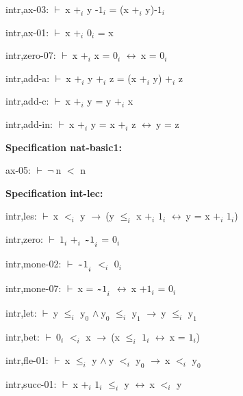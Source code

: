 \documentclass[a4paper]{article}
\newcommand{\tildesym}{\raisebox{-4pt}{\bf\~{}}}
\newcommand{\Fol}{\mbox{$\vdash\ $}}
\newcommand{\Not}{\mbox{$\neg\ $}}
\newcommand{\And}{\mbox{$\wedge\ $}}
\newcommand{\Imp}{\mbox{$\rightarrow\ $}}
\newcommand{\Equiv}{\mbox{$\leftrightarrow\ $}}
\begin{document}
intr,ax-03: 
 \Fol x $\mbox{+}_{i}$ y $\mbox{-1}_{i}$ = (x $\mbox{+}_{i}$ y)$\mbox{-1}_{i}$



intr,ax-01: 
 \Fol x $\mbox{+}_{i}$ $\mbox{0}_{i}$ = x



intr,zero-07: 
 \Fol x $\mbox{+}_{i}$ x = $\mbox{0}_{i}$ \Equiv x = $\mbox{0}_{i}$



intr,add-a: 
 \Fol x $\mbox{+}_{i}$ y $\mbox{+}_{i}$ z = (x $\mbox{+}_{i}$ y) $\mbox{+}_{i}$ z



intr,add-c: 
 \Fol x $\mbox{+}_{i}$ y = y $\mbox{+}_{i}$ x



intr,add-in: 
 \Fol x $\mbox{+}_{i}$ y = x $\mbox{+}_{i}$ z \Equiv y = z



{\bf Specification nat-basic1:}

ax-05: 
 \Fol \Not n $<$ n



{\bf Specification int-lec:}

intr,les: 
 \Fol x $\mbox{$<$}_{i}$ y \Imp (y $\mbox{$\le$}_{i}$ x $\mbox{+}_{i}$ $\mbox{1}_{i}$ \Equiv y = x $\mbox{+}_{i}$ $\mbox{1}_{i}$)



intr,zero: 
 \Fol $\mbox{1}_{i}$ $\mbox{+}_{i}$ $\mbox{$\tildesym$1}_{i}$ = $\mbox{0}_{i}$



intr,mone-02: 
 \Fol $\mbox{$\tildesym$1}_{i}$ $\mbox{$<$}_{i}$ $\mbox{0}_{i}$



intr,mone-07: 
 \Fol x = $\mbox{$\tildesym$1}_{i}$ \Equiv x $\mbox{+1}_{i}$ = $\mbox{0}_{i}$



intr,let: 
 \Fol y $\mbox{$\le$}_{i}$ $\mbox{y}_{0}$ \And $\mbox{y}_{0}$ $\mbox{$\le$}_{i}$ $\mbox{y}_{1}$ \Imp y $\mbox{$\le$}_{i}$ $\mbox{y}_{1}$



intr,bet: 
 \Fol $\mbox{0}_{i}$ $\mbox{$<$}_{i}$ x \Imp (x $\mbox{$\le$}_{i}$ $\mbox{1}_{i}$ \Equiv x = $\mbox{1}_{i}$)



intr,fle-01: 
 \Fol x $\mbox{$\le$}_{i}$ y \And y $\mbox{$<$}_{i}$ $\mbox{y}_{0}$ \Imp x $\mbox{$<$}_{i}$ $\mbox{y}_{0}$



intr,succ-01: 
 \Fol x $\mbox{+}_{i}$ $\mbox{1}_{i}$ $\mbox{$\le$}_{i}$ y \Equiv x $\mbox{$<$}_{i}$ y
\end{document}
